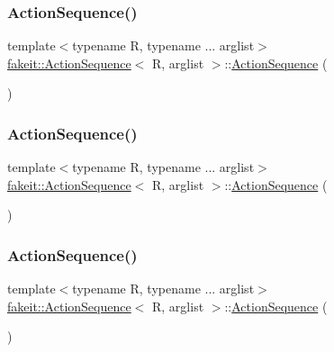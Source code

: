 \subsubsection{\texorpdfstring{ActionSequence()}{ActionSequence()}\hspace{0.1cm}{\footnotesize\ttfamily [6/9]}}
{\footnotesize\ttfamily template$<$typename R, typename ... arglist$>$ \\
\mbox{\hyperlink{structfakeit_1_1ActionSequence}{fakeit\+::\+Action\+Sequence}}$<$ R, arglist $>$\+::\mbox{\hyperlink{structfakeit_1_1ActionSequence}{Action\+Sequence}} (\begin{DoxyParamCaption}{ }\end{DoxyParamCaption})\hspace{0.3cm}{\ttfamily [inline]}}

\mbox{\label{structfakeit_1_1ActionSequence_a2c9b1deefcce41af21f9ad4b7b431c7d}} 
\subsubsection{\texorpdfstring{ActionSequence()}{ActionSequence()}\hspace{0.1cm}{\footnotesize\ttfamily [7/9]}}
{\footnotesize\ttfamily template$<$typename R, typename ... arglist$>$ \\
\mbox{\hyperlink{structfakeit_1_1ActionSequence}{fakeit\+::\+Action\+Sequence}}$<$ R, arglist $>$\+::\mbox{\hyperlink{structfakeit_1_1ActionSequence}{Action\+Sequence}} (\begin{DoxyParamCaption}{ }\end{DoxyParamCaption})\hspace{0.3cm}{\ttfamily [inline]}}

\mbox{\label{structfakeit_1_1ActionSequence_a2c9b1deefcce41af21f9ad4b7b431c7d}} 
\subsubsection{\texorpdfstring{ActionSequence()}{ActionSequence()}\hspace{0.1cm}{\footnotesize\ttfamily [8/9]}}
{\footnotesize\ttfamily template$<$typename R, typename ... arglist$>$ \\
\mbox{\hyperlink{structfakeit_1_1ActionSequence}{fakeit\+::\+Action\+Sequence}}$<$ R, arglist $>$\+::\mbox{\hyperlink{structfakeit_1_1ActionSequence}{Action\+Sequence}} (\begin{DoxyParamCaption}{ }\end{DoxyParamCaption})\hspace{0.3cm}{\ttfamily [inline]}}

